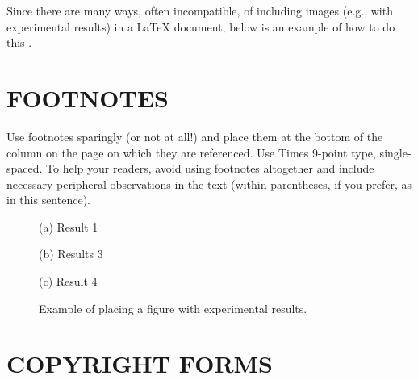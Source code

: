 \documentclass[letterpaper, 11 pt, twoside, conference]{ieeeconf}
\begin{document}
Since there are many ways, often incompatible, of including images (e.g., with
experimental results) in a LaTeX document, below is an example of how to do
this \cite{Chai1999}.

\section{FOOTNOTES}
\label{sec:foot}

Use footnotes sparingly (or not at all!) and place them at the bottom of the
column on the page on which they are referenced. Use Times 9-point type,
single-spaced. To help your readers, avoid using footnotes altogether and
include necessary peripheral observations in the text (within parentheses, if
you prefer, as in this sentence).

\begin{figure}[htb]

\begin{minipage}[b]{1.0\linewidth}
  \centering
  \centerline{(a) Result 1}\medskip
\end{minipage}
%
\begin{minipage}[b]{.48\linewidth}
  \centering
  \centerline{(b) Results 3}\medskip
\end{minipage}
\hfill
\begin{minipage}[b]{0.48\linewidth}
  \centering
  \centerline{(c) Result 4}\medskip
\end{minipage}
%
\caption{Example of placing a figure with experimental results.}
\label{fig:res}
%
\end{figure}



\section{COPYRIGHT FORMS}
\label{sec:copyright}
\end{document}
